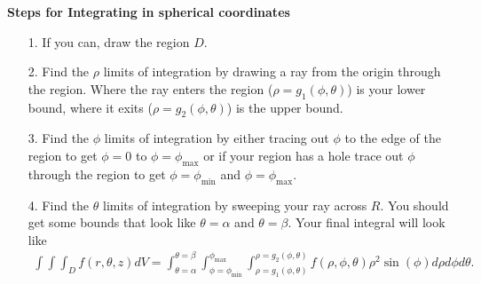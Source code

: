 \documentclass[12pt, letter]{article}
\theoremstyle{plain}
\numberwithin{theorem}{section}
\theoremstyle{definition}
\begin{document}
\textbf{Steps for Integrating in spherical coordinates}
\begin{itemize}
\item[1.] If you can, draw the region $D$.
\item[2.] Find the $\rho$ limits of integration by drawing a ray from the origin through the region. Where the ray enters the region ($\rho=g_1(\phi,\theta)$) is your lower bound, where it exits ($\rho=g_2(\phi,\theta)$) is the upper bound.
\item[3.] Find the $\phi$ limits of integration by either tracing out $\phi$ to the edge of the region to get $\phi=0$ to $\phi=\phi_{\text{max}}$ or if your region has a hole trace out $\phi$ through the region to get $\phi=\phi_{\text{min}}$ and $\phi=\phi_{\text{max}}$.
\item[4.] Find the $\theta$ limits of integration by sweeping your ray across $R$. You should get some bounds that look like $\theta=\alpha$ and $\theta=\beta$. Your final integral will look like
\begin{align*}
\int\int\int_D f(r,\theta,z) dV = \int_{\theta=\alpha}^{\theta=\beta} \int_{\phi=\phi_{\text{min}}}^{\phi_{\text{max}}} \int_{\rho=g_1(\phi,\theta)}^{\rho=g_2(\phi,\theta)} f(\rho,\phi,\theta) \rho^2\sin(\phi)d\rho d\phi d\theta.
\end{align*}
\end{itemize}

\bigskip

\hrulefill

\bigskip
\end{document}
